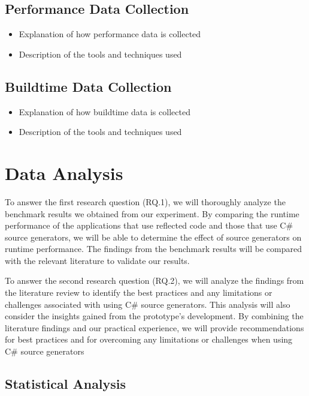\subsection{Performance Data Collection}

\begin{itemize}
    \item Explanation of how performance data is collected
    \item Description of the tools and techniques used
\end{itemize}

\subsection{Buildtime Data Collection}

\begin{itemize}
    \item Explanation of how buildtime data is collected
    \item Description of the tools and techniques used
\end{itemize}

\section{Data Analysis}

To answer the first research question (RQ.1), we will thoroughly analyze the benchmark results we obtained from our experiment. By comparing the runtime performance of the applications that use reflected code and those that use C\# source generators, we will be able to determine the effect of source generators on runtime performance. The findings from the benchmark results will be compared with the relevant literature to validate our results.

To answer the second research question (RQ.2), we will analyze the findings from the literature review to identify the best practices and any limitations or challenges associated with using C\# source generators. This analysis will also consider the insights gained from the prototype's development. By combining the literature findings and our practical experience, we will provide recommendations for best practices and for overcoming any limitations or challenges when using C\# source generators

\subsection{Statistical Analysis}

